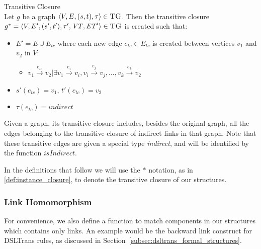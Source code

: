 \begin{definition}{Transitive Closure\\}
\label{def:instance_closure}
Let $g$ be a graph $\langle V,E,(s, t),\tau\rangle \in \textsc{TG}$. Then the transitive closure $g^{*} = \langle V,E',(s', t'),\tau', \mathit{VT}, \mathit{ET}' \rangle \in \textsc{TG}$ is created such that:

\begin{itemize}
\item $E' = E \cup E_{tc}$ where each new edge $e_{tc} \in E_{tc}$ is created between vertices $v_1$ and $v_2$ in $V$:
\begin{itemize}
\item $v_1\xrightarrow{e_{tc}}v_2 | \exists v_1\xrightarrow{e_i}v_i, v_i\xrightarrow{e_j}v_j, \dots, v_k\xrightarrow{e_k}v_2$
\end{itemize}

\item $s'(e_{tc}) = v_1$, $t'(e_{tc}) = v_2$
\item $\tau(e_{tc}) = \mathit{indirect}$
\end{itemize}

\end{definition}


Given a graph, its transitive closure includes, besides the original graph, all the edges belonging to the transitive closure of indirect links in that graph. Note that these transitive edges are given a special type \textit{indirect}, and will be identified by the function $\mathit{isIndirect}$.

In the definitions that follow we will use the $*$ notation, as in \cref{def:instance_closure}, to denote the transitive closure of our structures.


\subsubsection{Link Homomorphism}

For convenience, we also define a function to match components in our structures which contains only links. An example would be the backward link construct for DSLTrans rules, as discussed in Section~\ref{subsec:dsltrans_formal_structures}.

